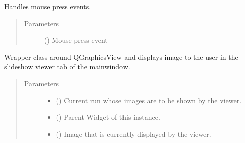\documentclass[letterpaper,10pt,english]{sphinxmanual}
\begin{document}
\begin{fulllineitems}

\begin{fulllineitems}
\label{\detokenize{polo.widgets:polo.widgets.slideshow_viewer.PhotoViewer.mousePressEvent}}
Handles mouse press events.
\begin{quote}\begin{description}
\item[{Parameters}] \leavevmode
{} () \textendash{} Mouse press event

\end{description}\end{quote}

\end{fulllineitems}


\begin{fulllineitems}
\label{\detokenize{polo.widgets:polo.widgets.slideshow_viewer.PhotoViewer.photoClicked}}
Wrapper class around QGraphicsView and displays image to the user
in the slideshow viewer tab of the mainwindow.
\begin{quote}\begin{description}
\item[{Parameters}] \leavevmode\begin{itemize}
\item {} 
 ({\hyperref[\detokenize{polo.crystallography:polo.crystallography.run.Run}]{}}) \textendash{} Current run whose images are to be shown by the viewer.

\item {} 
 () \textendash{} Parent Widget of this instance.

\item {} 
 ({\hyperref[\detokenize{polo.crystallography:polo.crystallography.image.Image}]{}}) \textendash{} Image that is currently displayed by the viewer.


\end{itemize}
\end{description}
\end{quote}
\end{fulllineitems}
\end{fulllineitems}
\end{document}
